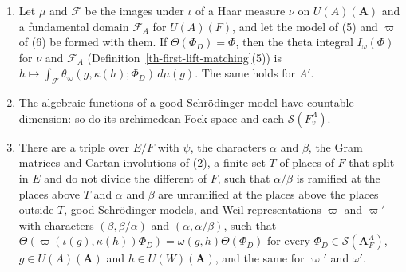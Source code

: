\begin{lemma}
\begin{enumerate}
  is defined by these Cartan involutions. Every $\Phi\in\mathcal A(-A,W)$ is
  $\Theta(\Phi_D)$ for an algebraic function $\Phi_D$ of the model, and
  $\Theta(\Phi_D)\in\mathcal A(-A,W)$ for every algebraic function $\Phi_D$.
  The same holds for $A'$.
\item Let $\mu$ and $\mathcal F$ be the images under $\iota$ of a Haar measure
  $\nu$ on $U(A)(\mathbf A)$ and a fundamental domain $\mathcal F_A$ for
  $U(A)(F)$, and let the model of (5) and $\varpi$ of (6) be formed with them.
  If $\Theta(\Phi_D)=\Phi$, then the theta integral $I_\omega(\Phi)$ for
  $\nu$ and $\mathcal F_A$ (Definition~\ref{th-first-lift-matching}(5)) is
  $h\mapsto\int_{\mathcal F}\theta_\varpi(g,\kappa(h);\Phi_D)\,d\mu(g)$. The
  same holds for $A'$.
\item The algebraic functions of a good Schrödinger model have countable
  dimension: so do its archimedean Fock space and each
  $\mathcal S(F_v^\Lambda)$.
\item There are a triple over $E/F$ with $\psi$, the characters $\alpha$
  and $\beta$, the Gram matrices and Cartan involutions of (2), a finite set
  $T$ of places of $F$ that split in $E$ and do not divide the different of
  $F$, such that $\alpha/\beta$ is ramified at the places above $T$ and
  $\alpha$ and $\beta$ are unramified at the places above the places outside
  $T$, good Schrödinger models, and Weil representations $\varpi$ and
  $\varpi'$ with characters $(\beta,\beta/\alpha)$ and $(\alpha,\alpha/\beta)$,
  such that
  $\Theta(\varpi(\iota(g),\kappa(h))\Phi_D)=\omega(g,h)\Theta(\Phi_D)$ for
  every $\Phi_D\in\mathcal S(\mathbf A_F^\Lambda)$, $g\in U(A)(\mathbf A)$ and
  $h\in U(W)(\mathbf A)$, and the same for $\varpi'$ and $\omega'$.
\end{enumerate}
\end{lemma}
